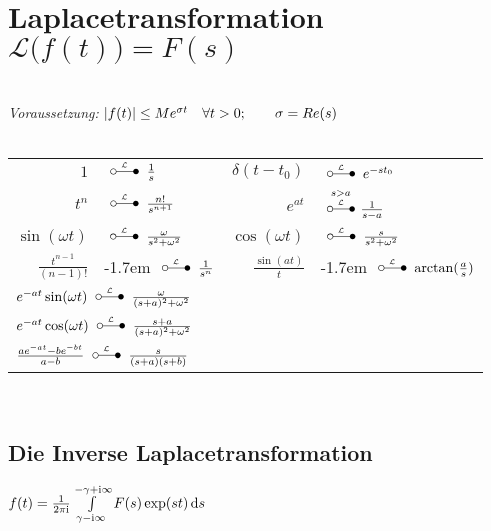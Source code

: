 \documentclass[german,color,5pt]{latex4ei/latex4ei_fs}
\begin{document}
\section{Laplacetransformation \quad $\mathcal L\bigl(f(t)\bigr) = F(s)$}
\begin{sectionbox}
		\\
	\emph{Voraussetzung:} $\left\vert f(t)\right\vert \leq M e^{\sigma t} \quad \forall t > 0; \qquad \sigma = Re(s)$\\
	\\
	\everymath{\displaystyle}	%
	\begin{tabular}{rl|rl}
		$1$ & \!\!\!\!\!\!\!\!\!\!$\LT \frac{1}{s}$ & $\delta(t-t_0)$ & \!\!\!\!\!\!\!\!\!\!$\LT e^{-s t_0}$\\[0.2em]
		$t^n$ & \!\!\!\!\!\!\!\!\!\!$\LT \frac{n!}{s^{n+1}}$ & $e^{at}$  & \!\!\!\!\!\!\!\!\!\!$\overset{s > a}{ \LT } \frac{1}{s-a}$\\[0.5em] 
		$\sin(\omega t)$ & \!\!\!\!\!\!\!\!\!\!$\LT \frac{\omega}{s^2 + \omega^2}$ & $\cos(\omega t)$ & \!\!\!\!\!\!\!\!\!\!$\LT \frac{s}{s^2 + \omega^2}$\\[0.5em]
		$\frac{t^{n-1}}{(n-1)!}$   & \kern-1.7em $\LT \frac{1}{s^n}$ & $\frac{\sin(at)}{t}$ & \kern-1.7em $\LT\arctan(\frac{a}{s})$\\[0.5em]
		\multicolumn{4}{l}{ $e^{-at} \sin(\omega t) \LT \frac{\omega}{(s+a)^2+\omega^2}$} \\
		\multicolumn{4}{l}{ $e^{-at} \cos(\omega t) \LT \frac{s+a}{(s+a)^2+\omega^2}$}\\
		\multicolumn{4}{l}{$\frac{ae^{-at}-be^{-bt}}{a-b} \LT \frac{s}{(s+a)(s+b)}$}
	\end{tabular}\\
	\subsection{Die Inverse Laplacetransformation}
	$f(t) = \frac{1}{2\pi \i} \int\limits_{\gamma - \i \infty}^{-\gamma + \i \infty} F(s) \exp(st) \diff s$
\end{sectionbox}
\end{document}
